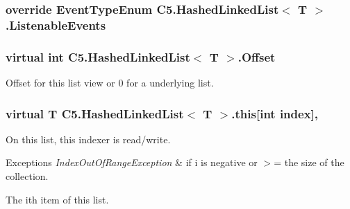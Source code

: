 \subsubsection[{Listenable\+Events}]{\setlength{\rightskip}{0pt plus 5cm}override {\bf Event\+Type\+Enum} {\bf C5.\+Hashed\+Linked\+List}$<$ T $>$.Listenable\+Events\hspace{0.3cm}{\ttfamily [get]}}\label{class_c5_1_1_hashed_linked_list_a2eab2146c49daf255c542b957656b25c}




\hypertarget{class_c5_1_1_hashed_linked_list_aae6da46ea57defcd779416e00622adbb}{}
\subsubsection[{Offset}]{\setlength{\rightskip}{0pt plus 5cm}virtual int {\bf C5.\+Hashed\+Linked\+List}$<$ T $>$.Offset\hspace{0.3cm}{\ttfamily [get]}}\label{class_c5_1_1_hashed_linked_list_aae6da46ea57defcd779416e00622adbb}




Offset for this list view or 0 for a underlying list.\hypertarget{class_c5_1_1_hashed_linked_list_aacd03b9a2e43ade0185cf745b3374994}{}
\subsubsection[{this[int index]}]{\setlength{\rightskip}{0pt plus 5cm}virtual T {\bf C5.\+Hashed\+Linked\+List}$<$ T $>$.this\mbox{[}int index\mbox{]}\hspace{0.3cm}{\ttfamily [get]}, {\ttfamily [set]}}\label{class_c5_1_1_hashed_linked_list_aacd03b9a2e43ade0185cf745b3374994}


On this list, this indexer is read/write. 
\begin{DoxyExceptions}{Exceptions}
{\em Index\+Out\+Of\+Range\+Exception} & if i is negative or $>$= the size of the collection. \\
\hline
\end{DoxyExceptions}


The i\textquotesingle{}th item of this list.


